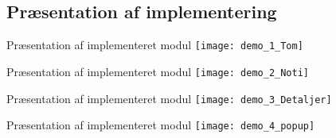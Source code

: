 \subsection{Præsentation af implementering}
\begin{frame}{Præsentation af implementeret modul} %
\centering
\texttt{[image: demo\_1\_Tom]}
\end{frame}

\begin{frame}{Præsentation af implementeret modul} %
	\centering
	\texttt{[image: demo\_2\_Noti]}
\end{frame}

\begin{frame}{Præsentation af implementeret modul} %
	\centering
	\texttt{[image: demo\_3\_Detaljer]}
\end{frame}

\begin{frame}{Præsentation	 af implementeret modul} %
	\centering
	\texttt{[image: demo\_4\_popup]}
\end{frame}